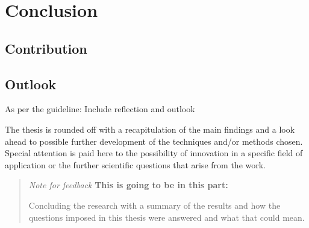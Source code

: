 \section{Conclusion}

\subsection{Contribution}

\subsection{Outlook}

As per the guideline: Include reflection and outlook

The thesis is rounded off with a recapitulation of the main findings and a look ahead to possible further
development of the techniques and/or methods chosen. Special attention is paid here to the possibility of
innovation in a specific field of application or the further scientific questions that arise from the work.

\blockquote{
\textit{Note for feedback}
\textbf{This is going to be in this part:}

Concluding the research with a summary of the results and how the questions imposed in this thesis were answered and what that could mean.

}